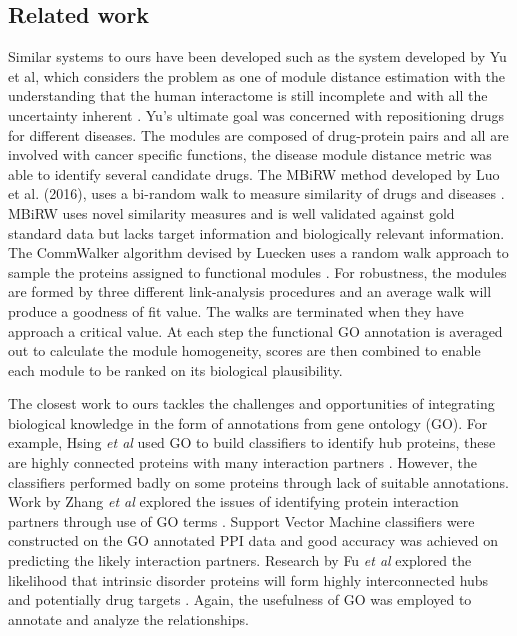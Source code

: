\documentclass[a4paper,8pt,twocolumn,5p]{elsarticle}
\begin{document}
\subsection{Related work}
Similar systems to ours have been developed such as the system developed by Yu et al, which considers the problem as one of module distance estimation with the understanding that the human interactome is still incomplete and with all the uncertainty inherent \cite{Yu2016}. Yu's ultimate goal was concerned with repositioning drugs for different diseases. The modules are composed of drug-protein pairs and all are involved with cancer specific functions, the disease module distance metric was able to identify several candidate drugs. The MBiRW method developed by Luo et al. (2016), uses a bi-random walk to measure similarity of drugs and diseases \cite{Luo2016}. MBiRW uses novel similarity measures and is well validated against gold standard data but lacks target information and biologically relevant information.  The CommWalker algorithm devised by Luecken uses a random walk approach to sample the proteins assigned to functional modules \cite{Luecken2017}. For robustness, the modules are formed by three different link-analysis procedures and an average walk will produce a goodness of fit value. The walks are terminated when they have approach a critical value. At each step the functional GO annotation is averaged out to calculate  the module homogeneity, scores are then combined to enable each module to be ranked on its biological plausibility. 
 
The closest work to ours tackles the challenges and opportunities of integrating biological knowledge in the form of annotations from gene ontology (GO). For example, Hsing {\it et al} used GO to build classifiers to identify hub proteins, these are highly connected proteins with many interaction partners \cite{Hsing2008}. However,  the classifiers performed badly on some proteins through lack of suitable annotations. Work by Zhang {\it et al} explored the issues of identifying protein interaction partners through use of GO terms \cite{SBZhang2016}. Support Vector Machine classifiers were constructed on the GO annotated PPI data and good accuracy was achieved on predicting the likely interaction partners. Research by Fu {\it et al} explored the likelihood that  intrinsic disorder proteins will form highly interconnected hubs  and potentially drug targets \cite{Fu2015}. Again, the usefulness of GO was employed to annotate and analyze the relationships. 
\end{document}

